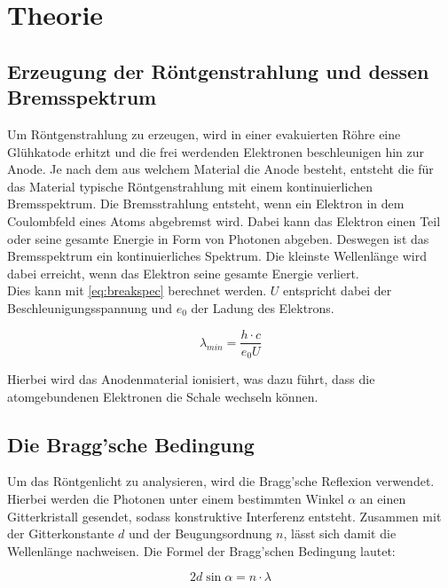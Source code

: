 \section{Theorie}
\label{sec:Theorie}

\subsection{Erzeugung der Röntgenstrahlung und dessen Bremsspektrum}

Um Röntgenstrahlung zu erzeugen, wird in einer evakuierten Röhre eine Glühkatode erhitzt und die frei werdenden Elektronen beschleunigen hin zur Anode.
Je nach dem aus welchem Material die Anode besteht, entsteht die für das Material typische Röntgenstrahlung mit einem kontinuierlichen Bremsspektrum.
Die Bremsstrahlung entsteht, wenn ein Elektron in dem Coulombfeld eines Atoms abgebremst wird.
Dabei kann das Elektron einen Teil oder seine gesamte Energie in Form von Photonen abgeben. Deswegen ist das Bremsspektrum ein kontinuierliches Spektrum.
Die kleinste Wellenlänge wird dabei erreicht, wenn das Elektron seine gesamte Energie verliert.\\
Dies kann mit \autoref{eq:breakspec} berechnet werden. $U$ entspricht dabei der Beschleunigungsspannung und $e_0$ der Ladung des Elektrons.

\begin{equation}
    \lambda_{min} = \frac{h\cdot c}{e_0U}
    \label{eq:breakspec}
\end{equation}

Hierbei wird das Anodenmaterial ionisiert, was dazu führt, dass die atomgebundenen Elektronen die Schale wechseln können.

\subsection{Die Bragg'sche Bedingung}

Um das Röntgenlicht zu analysieren, wird die Bragg'sche Reflexion verwendet.\\
Hierbei werden die Photonen unter einem bestimmten Winkel $\alpha$ an einen Gitterkristall gesendet, sodass konstruktive Interferenz entsteht.
Zusammen mit der Gitterkonstante $d$ und der Beugungsordnung $n$, lässt sich damit die Wellenlänge nachweisen.
Die Formel der Bragg'schen Bedingung lautet:

\begin{equation}
    2d\sin{\alpha} = n\cdot \lambda
    \label{eq:bragg}
\end{equation}

